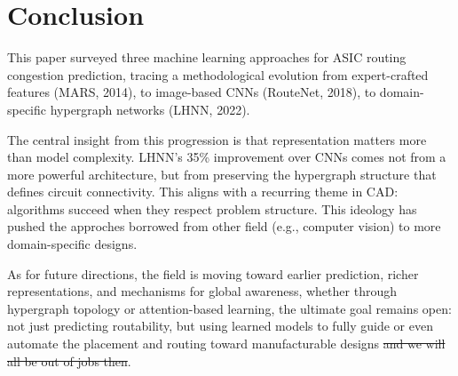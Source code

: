 \documentclass[sigconf]{acmart}
\begin{document}
\section{Conclusion}

This paper surveyed three machine learning approaches for ASIC routing 
congestion prediction, tracing a methodological evolution from 
expert-crafted features (MARS, 2014), to image-based CNNs (RouteNet, 2018), 
to domain-specific hypergraph networks (LHNN, 2022). 

The central insight from this progression is that representation matters 
more than model complexity. LHNN's 35\% improvement over CNNs comes not 
from a more powerful architecture, but from preserving the hypergraph 
structure that defines circuit connectivity. This aligns with a recurring 
theme in CAD: algorithms succeed when they respect problem structure. This ideology has pushed the approches borrowed from other field (e.g., computer vision) to more domain-specific designs.

As for future directions, the field is moving toward earlier prediction, richer representations, 
and mechanisms for global awareness, whether through hypergraph topology 
or attention-based learning, the ultimate goal remains open: not just 
predicting routability, but using learned models to fully guide or even automate the placement and 
routing toward manufacturable designs \sout{and we will all be out of jobs then}.


\newpage


\end{document}
